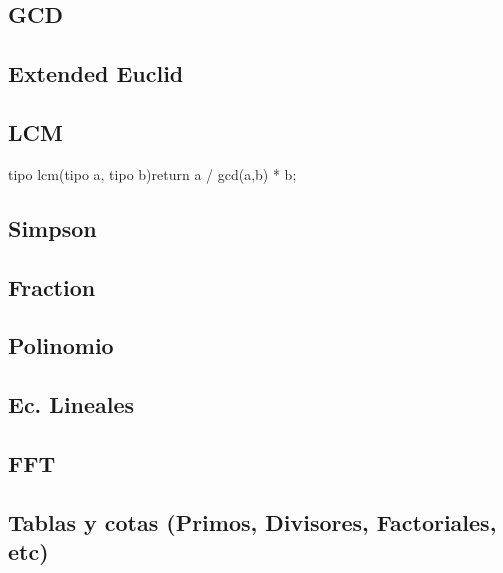 \subsection{GCD}
\subsection{Extended Euclid}
\subsection{LCM}
\begin{code}
tipo lcm(tipo a, tipo b){return a / gcd(a,b) * b;}
\end{code}
\subsection{Simpson}
\subsection{Fraction}
\subsection{Polinomio}
\subsection{Ec. Lineales}
\subsection{FFT}
\subsection{Tablas y cotas (Primos, Divisores, Factoriales, etc)}
